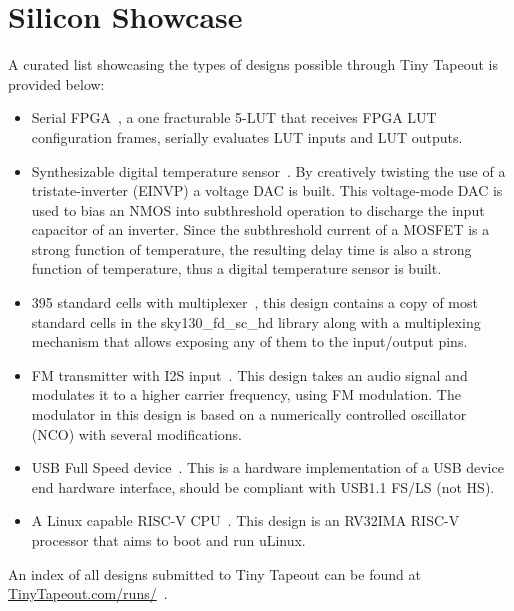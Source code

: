 \section{Silicon Showcase}
\label{sec:silicon_showcase}

A curated list showcasing the types of designs possible through Tiny Tapeout is provided below:

\begin{itemize}
    \item Serial FPGA~\cite{showcaseserialfpga}, a one fracturable 5-LUT that receives FPGA LUT configuration frames, serially evaluates LUT inputs and LUT outputs.
    \item Synthesizable digital temperature sensor~\cite{showcasetempsense}. By creatively twisting the use of a tristate-inverter (EINVP) a voltage DAC is built. This voltage-mode DAC is used to bias an NMOS into subthreshold operation to discharge the input capacitor of an inverter. Since the subthreshold current of a MOSFET is a strong function of temperature, the resulting delay time is also a strong function of temperature, thus a digital temperature sensor is built.
    \item 395 standard cells with multiplexer~\cite{showcasemicrotapeout}, this design contains a copy of most standard cells in the sky130_fd_sc_hd library along with a multiplexing mechanism that allows exposing any of them to the input/output pins.
    \item FM transmitter with I2S input~\cite{showcasefmtx}. This design takes an audio signal and modulates it to a higher carrier frequency, using FM modulation. The modulator in this design is based on a numerically controlled oscillator (NCO) with several modifications.
    \item USB Full Speed device~\cite{showcaseusb}. This is a hardware implementation of a USB device end hardware interface, should be compliant with USB1.1 FS/LS (not HS).
    \item A Linux capable RISC-V CPU~\cite{showcasekianv}. This design is an RV32IMA RISC-V processor that aims to boot and run uLinux.
\end{itemize}

An index of all designs submitted to Tiny Tapeout can be found at \url{TinyTapeout.com/runs/}~\cite{tinytapeoutruns}.
